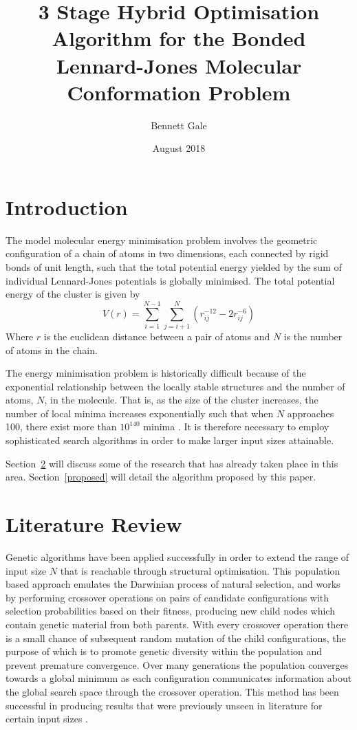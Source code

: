 \documentclass{article}
\title{3 Stage Hybrid Optimisation Algorithm for the Bonded Lennard-Jones Molecular Conformation Problem}
\author{Bennett Gale}
\date{August 2018}
\begin{document}
\maketitle
\tableofcontents
\pagebreak

\section{Introduction}

The model molecular energy minimisation problem involves the geometric
configuration of a chain of atoms in two dimensions, each connected by rigid
bonds of unit length, such that the total potential energy yielded by the sum of
individual Lennard-Jones potentials is globally minimised. The total potential
energy of the cluster is given by 
$$V(r)=\sum^{N-1}_{i=1}\sum^{N}_{j=i+1}\left(r^{-12}_{ij}-2r^{-6}_{ij}\right)$$
Where $r$ is the euclidean distance between a pair of atoms and $N$ is the
number of atoms in the chain.

The energy minimisation problem is historically difficult because of the
exponential relationship between the locally stable structures and the number of
atoms, $N$, in the molecule. That is, as the size of the cluster increases, the
number of local minima increases exponentially such that when $N$ approaches
100, there exist more than $10^{140}$ minima \cite{DAVEN1996195}. It is
therefore necessary to employ sophisticated search algorithms in order to make
larger input sizes attainable.

Section~\ref{litreview} will discuss some of the research that has already taken
place in this area. Section~\ref{proposed} will detail the algorithm proposed by
this paper.

\section{Literature Review} \label{litreview}

Genetic algorithms have been applied \cite{doi:10.1002/qua.560440214,
PULLAN1998331} successfully in order to extend the range of input size $N$ that
is reachable through structural optimisation. This population based approach
emulates the Darwinian process of natural selection, and works by performing
crossover operations on pairs of candidate configurations with selection
probabilities based on their fitness, producing new child nodes which contain
genetic material from both parents. With every crossover operation there is a
small chance of subsequent random mutation of the child configurations, the
purpose of which is to promote genetic diversity within the population and
prevent premature convergence. Over many generations the population converges
towards a global minimum as each configuration communicates information about
the global search space through the crossover operation. This method has been
successful in producing results that were previously unseen in literature for
certain input sizes \cite{PULLAN1998331}.
\end{document}
